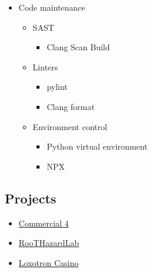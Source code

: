 \begin{itemize}
    \item Code maintenance
    \begin{itemize}
        \item SAST
        \begin{itemize}
            \item Clang Scan Build
        \end{itemize}

        \item Linters
        \begin{itemize}
            \item pylint
            \item Clang format
        \end{itemize}

        \item Environment control
        \begin{itemize}
            \item Python virtual environment
            \item NPX
        \end{itemize}
    \end{itemize}
\end{itemize}

\subsection{Projects}

\begin{itemize}
    \item \hyperlink{proj_com4}{Commercial 4}
    \item \hyperlink{proj_rhl}{RooTHazardLab}
    \item \hyperlink{proj_loxotron}{Loxotron Casino}
\end{itemize}

\newpage
